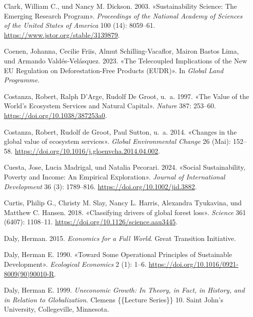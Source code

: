 \documentclass[
  nswissgerman,
  a4paper,
  openany]{book}
\newlength{\cslhangindent}
\newenvironment{CSLReferences}[2] %
 {\begin{list}{}{%
  \setlength{\itemindent}{0pt}
  \setlength{\leftmargin}{0pt}
  \setlength{\parsep}{0pt}
  \ifodd #1
   \setlength{\leftmargin}{\cslhangindent}
   \setlength{\itemindent}{-1\cslhangindent}
  \fi
  \setlength{\itemsep}{#2\baselineskip}}}
 {\end{list}}
\begin{document}
\begin{CSLReferences}{1}{1}
Clark, William C., und Nancy M. Dickson. 2003. {«Sustainability
{Science}: {The Emerging Research Program}»}. \emph{Proceedings of the
National Academy of Sciences of the United States of America} 100 (14):
8059--61. \url{https://www.jstor.org/stable/3139879}.

Coenen, Johanna, Cecilie Friis, Almut Schilling-Vacaflor, Mairon Bastos
Lima, und Armando Valdés-Velásquez. 2023. {«The Telecoupled Implications
of the New {EU Regulation} on Deforestation-Free Products ({EUDR})»}. In
\emph{Global Land Programme}.

Costanza, Robert, Ralph D'Arge, Rudolf De Groot, u.~a. 1997. {«The
{Value} of the {World}'s {Ecosystem} {Services} and {Natural}
{Capital}»}. \emph{Nature} 387: 253--60.
\url{https://doi.org/10.1038/387253a0}.

Costanza, Robert, Rudolf de Groot, Paul Sutton, u.~a. 2014. {«Changes in
the global value of ecosystem services»}. \emph{Global Environmental
Change} 26 (Mai): 152--58.
\url{https://doi.org/10.1016/j.gloenvcha.2014.04.002}.

Cuesta, Jose, Lucia Madrigal, und Natalia Pecorari. 2024. {«Social
Sustainability, Poverty and Income: {An} Empirical Exploration»}.
\emph{Journal of International Development} 36 (3): 1789--816.
\url{https://doi.org/10.1002/jid.3882}.

Curtis, Philip G., Christy M. Slay, Nancy L. Harris, Alexandra
Tyukavina, und Matthew C. Hansen. 2018. {«Classifying drivers of global
forest loss»}. \emph{Science} 361 (6407): 1108--11.
\url{https://doi.org/10.1126/science.aau3445}.

Daly, Herman. 2015. \emph{Economics for a {Full World}}. Great
Transition Initiative.

Daly, Herman E. 1990. {«Toward Some Operational Principles of
Sustainable Development»}. \emph{Ecological Economics} 2 (1): 1--6.
\url{https://doi.org/10.1016/0921-8009(90)90010-R}.

Daly, Herman E. 1999. \emph{Uneconomic {Growth}: {In Theory}, in {Fact},
in {History}, and in {Relation} to {Globalization}}. Clemens \{\{Lecture
Series\}\} 10. Saint John's University, Collegeville, Minnesota.


\end{CSLReferences}
\end{document}
